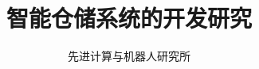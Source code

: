 \documentclass{article}
\newcommand{\xiaosihao}{\fontsize{12pt}{\baselineskip}\selectfont}
\begin{document}
	
\newtheorem{example}{例}             %
\newtheorem{algorithm}{算法}
\newtheorem{theorem}{定理}[section]  %
\newtheorem{definition}{定义}
\newtheorem{axiom}{公理}
\newtheorem{property}{性质}
\newtheorem{proposition}{命题}
\newtheorem{lemma}{引理}
\newtheorem{corollary}{推论}
\newtheorem{remark}{注解}
\newtheorem{condition}{条件}
\newtheorem{conclusion}{结论}
\newtheorem{assumption}{假设}

\renewcommand{\contentsname}{目录}  %
\renewcommand{\abstractname}{摘要}  %
\renewcommand{\refname}{参考文献}   %
\renewcommand{\indexname}{索引}
\renewcommand{\figurename}{图}
\renewcommand{\tablename}{表}
\renewcommand{\appendixname}{附录}
\renewcommand{\algorithm}{算法}	

\title{智能仓储系统的开发研究}
\author{\xiaosihao 先进计算与机器人研究所}
		
\maketitle
		
\tableofcontents
\newpage
\end{document}
